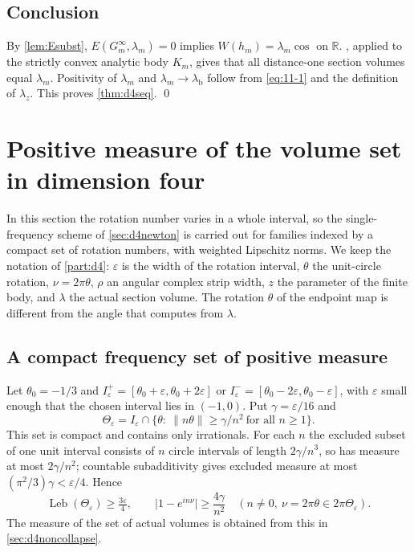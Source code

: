 \documentclass[11pt]{amsart}
\numberwithin{equation}{section}
\theoremstyle{definition}
\theoremstyle{remark}
\newcommand{\R}{\mathbb{R}}
\newcommand{\eps}{\varepsilon}
\newcommand{\abs}[1]{\lvert #1\rvert}
\newcommand{\norm}[1]{\lVert #1\rVert}
\newcommand{\Leb}{\operatorname{Leb}}
\newcommand{\lb}{\lambda_{\mathrm b}}
\begin{document}
\subsection{Conclusion}
By \cref{lem:Esubst}, $E(G_m^\infty,\lambda_m)=0$ implies $W(h_m)=\lambda_m\cos$ on $\R$. , applied to the strictly convex analytic body $K_m$, gives that all distance-one section volumes equal $\lambda_m$. Positivity of $\lambda_m$ and $\lambda_m\to\lb$ follow from \eqref{eq:11-1} and the definition of $\lambda_z$. This proves \cref{thm:d4seq}. \qed

\section{Positive measure of the volume set in dimension four}\label{sec:d4meas}

In this section the rotation number varies in a whole interval, so the single-frequency scheme of \cref{sec:d4newton} is carried out for families indexed by a compact set of rotation numbers, with weighted Lipschitz norms. We keep the notation of \cref{part:d4}: $\eps$ is the width of the rotation interval, $\theta$ the unit-circle rotation, $\nu=2\pi\theta$, $\rho$ an angular complex strip width, $z$ the parameter of the finite body, and $\lambda$ the actual section volume. The rotation $\theta$ of the endpoint map is different from the angle that \cite{HR} computes from $\lambda$.

\subsection{A compact frequency set of positive measure}
Let $\theta_0=-1/3$ and $I_\eps^+=[\theta_0+\eps,\theta_0+2\eps]$ or $I_\eps^-=[\theta_0-2\eps,\theta_0-\eps]$, with $\eps$ small enough that the chosen interval lies in $(-1,0)$. Put $\gamma=\eps/16$ and
\[
\Theta_\eps=I_\eps\cap\{\theta:\ \norm{n\theta}\ge\gamma/n^2\ \text{for all }n\ge1\}.
\]
This set is compact and contains only irrationals. For each $n$ the excluded subset of one unit interval consists of $n$ circle intervals of length $2\gamma/n^3$, so has measure at most $2\gamma/n^2$; countable subadditivity gives excluded measure at most $(\pi^2/3)\gamma<\eps/4$. Hence
\begin{equation}\label{eq:Theta}
\Leb(\Theta_\eps)\ge\tfrac{3\eps}4,\qquad\abs{1-e^{in\nu}}\ge\frac{4\gamma}{n^2}\quad(n\ne0,\ \nu=2\pi\theta\in2\pi\Theta_\eps).
\end{equation}
The measure of the set of actual volumes is obtained from this in \cref{sec:d4noncollapse}.
\end{document}
